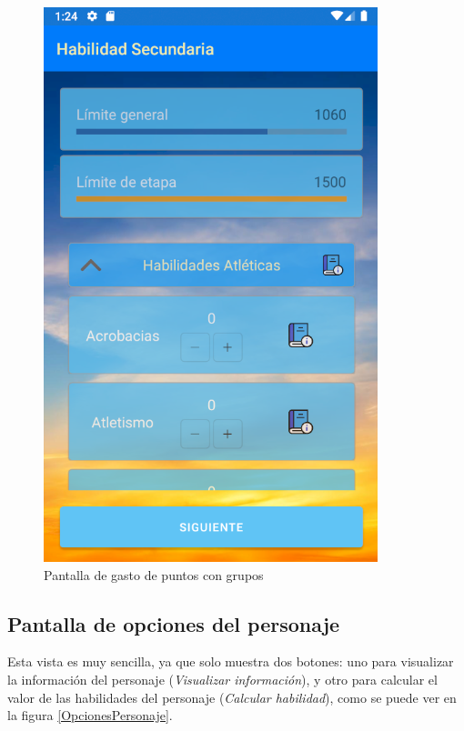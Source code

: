 \begin{figure}[H]
    \centering
    \includegraphics[scale=0.3]{Figures/Capturas/GastoPuntosGrupo.png}
    \caption{Pantalla de gasto de puntos con grupos}
    \label{GastoPuntosGrupos}    
\end{figure}

\subsection{Pantalla de opciones del personaje}
Esta vista es muy sencilla, ya que solo muestra dos botones: uno para visualizar la información del personaje 
(\textit{Visualizar información}), y otro para calcular el valor de las habilidades del personaje (\textit{Calcular habilidad}), 
como se puede ver en la figura \ref*{OpcionesPersonaje}.


